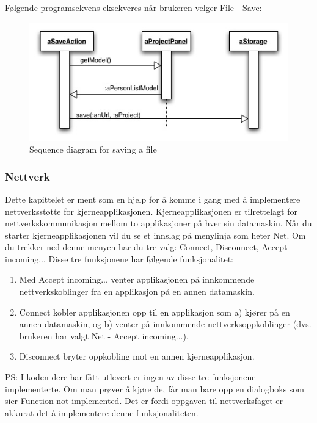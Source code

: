 \documentclass[a4paper]{scrartcl}
\begin{document}
Følgende programsekvens eksekveres når brukeren velger File - Save:

\begin{figure}[H]
    \centering
    \includegraphics[width=\textwidth]{resources/sequence-save-file.jpg}
    \caption{Sequence diagram for saving a file}
    \label{fig:sequence-save-file}
\end{figure}

\subsubsection{Nettverk}

Dette kapittelet er ment som en hjelp for å komme i gang med å implementere nettverksstøtte for kjerneapplikasjonen. Kjerneapplikasjonen er tilrettelagt for nettverkskommunikasjon mellom to applikasjoner på hver sin datamaskin. Når du starter kjerneapplikasjonen vil du se et innslag på menylinja som heter Net. Om du trekker ned denne menyen har du tre valg: Connect, Disconnect, Accept incoming... Disse tre funksjonene har følgende funksjonalitet:

\begin{enumerate}

\item
Med Accept incoming... venter applikasjonen på innkommende nettverkskoblinger fra en applikasjon på en annen datamaskin.

\item
Connect kobler applikasjonen opp til en applikasjon som a) kjører på en annen datamaskin, og b) venter på innkommende nettverksoppkoblinger (dvs. brukeren har valgt Net - Accept incoming...). 

\item
Disconnect bryter oppkobling mot en annen kjerneapplikasjon.

\end{enumerate}

PS: I koden dere har fått utlevert er ingen av disse tre funksjonene implementerte. Om man prøver å kjøre de, får man bare opp en dialogboks som sier Function not implemented. Det er fordi oppgaven til nettverksfaget er akkurat det å implementere denne funksjonaliteten.
\end{document}

